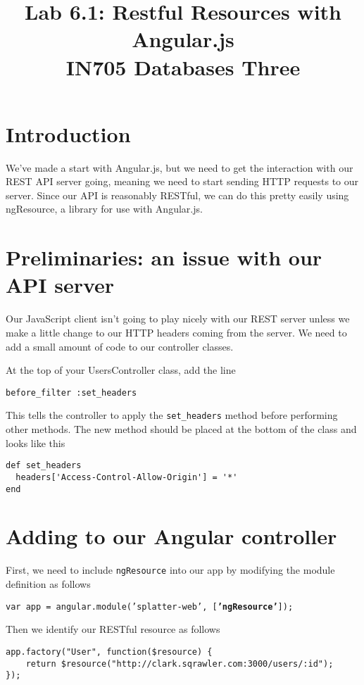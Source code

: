 \documentclass{article}
\begin{document}
\title{Lab 6.1: Restful Resources with Angular.js\\ IN705 Databases Three}
\date{}
\maketitle

\section*{Introduction}
We've made a start with Angular.js, but we need to get the interaction with our REST API server going, meaning we need to start sending HTTP requests to our server.  Since our API is reasonably RESTful, we can do this pretty easily using ngResource, a library for use with Angular.js.

\section{Preliminaries: an issue with our API server}
Our JavaScript client isn't going to play nicely with our REST server unless we make a little change to our HTTP headers coming from the server.  We need to add a small amount of code to our controller classes.

At the top of your UsersController class, add the line

\texttt{before\_filter :set\_headers}

This tells the controller to apply the \texttt{set\_headers} method before performing other methods.  The new method should be placed at the bottom of the class and looks like this

\begin{verbatim}
def set_headers
  headers['Access-Control-Allow-Origin'] = '*'
end
\end{verbatim}


\section{Adding to our Angular controller}
First, we need to include \texttt{ngResource} into our app by modifying the module definition as follows

\texttt{var app = angular.module('splatter-web', [\textbf{'ngResource'}]);}

Then we identify our RESTful resource as follows

\begin{verbatim}
app.factory("User", function($resource) {
	return $resource("http://clark.sqrawler.com:3000/users/:id");
});
\end{verbatim}
\end{document}
